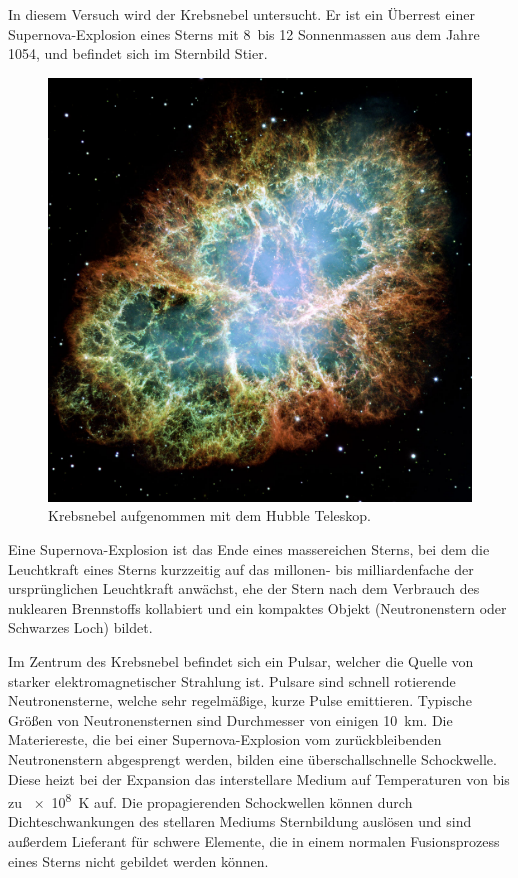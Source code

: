 In diesem Versuch wird der Krebsnebel untersucht.
Er ist ein Überrest einer Supernova-Explosion eines Sterns
mit 8~bis 12 Sonnenmassen aus dem Jahre 1054,
und befindet sich im Sternbild Stier.

\begin{figure}
		\includegraphics[width=\linewidth]{pictures/crab.jpg}
		\caption{Krebsnebel aufgenommen mit dem Hubble Teleskop.}%
		\label{fig:magic}
\end{figure}

Eine Supernova-Explosion ist das Ende eines massereichen Sterns,
bei dem die Leuchtkraft eines Sterns kurzzeitig auf das millonen- bis
milliardenfache der ursprünglichen Leuchtkraft anwächst,
ehe der Stern nach dem Verbrauch des
nuklearen Brennstoffs kollabiert und ein kompaktes Objekt
(Neutronenstern oder Schwarzes Loch) bildet.

Im Zentrum des Krebsnebel befindet sich ein Pulsar,
welcher die Quelle von starker elektromagnetischer Strahlung ist.
Pulsare sind schnell rotierende Neutronensterne,
welche sehr regelmäßige, kurze Pulse emittieren.
Typische Größen von Neutronensternen sind Durchmesser von einigen
\SI{10}{\kilo\meter}.
Die Materiereste, die bei einer Supernova-Explosion
vom zurückbleibenden Neutronenstern abgesprengt werden,
bilden eine überschallschnelle Schockwelle.
Diese heizt bei der Expansion das interstellare Medium auf Temperaturen von bis zu
\SI{e8}{\kelvin} auf.
Die propagierenden Schockwellen können durch Dichteschwankungen des stellaren
Mediums Sternbildung auslösen
und sind außerdem Lieferant für schwere Elemente, die in einem normalen
Fusionsprozess eines Sterns nicht gebildet werden können.

